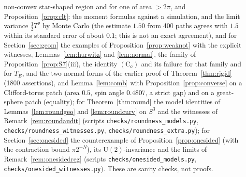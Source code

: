 \documentclass[11pt,reqno]{amsart}
\theoremstyle{definition}
\theoremstyle{remark}
\numberwithin{equation}{section}
\begin{document}
non-convex star-shaped region and for one of area $>2\pi$, and Proposition~\ref{prop:clt}: the moment formulas against a
simulation, and the limit variance $\tfrac32T^2$ by Monte Carlo (the estimate $1.50$ from 400 paths agrees with $1.5$ within
its standard error of about $0.1$; this is not an exact agreement), and for Section~\ref{sec:geom} the examples of
Proposition~\ref{prop:weaknot} with the explicit witnesses, Lemmas~\ref{lem:hurwitz} and \ref{lem:normal}, the family of
Proposition~\ref{prop:S7}(iii), the identity $(\mathrm C_o)$ and its failure for that family and for $T_E$, and the two normal forms of the
earlier proof of Theorem~\ref{thm:rigid} (1800 assertions), and Lemma~\ref{lem:comb} with Proposition~\ref{prop:converse} on a
Clifford-torus patch (area $0.5$, spin angle $0.4807$, a strict gap) and on a great-sphere patch (equality); for
Theorem~\ref{thm:round} the model identities of Lemmas~\ref{lem:roundgeo} and \ref{lem:roundcurv} on $S^3$ and the witnesses of
Remark~\ref{rem:roundaudit} (scripts \texttt{checks/roundness\_models.py}, \texttt{checks/roundness\_witnesses.py},
\texttt{checks/roundness\_extra.py}); for Section~\ref{sec:onesided} the counterexample of Proposition~\ref{prop:onesided} (with the
contraction bound $\pi2^{-N}$), its $\mathrm U(2)$-invariance and the limits of Remark~\ref{rem:onesidedreg} (scripts
\texttt{checks/onesided\_models.py}, \texttt{checks/onesided\_witnesses.py}).  These are sanity checks, not proofs.
\end{document}
